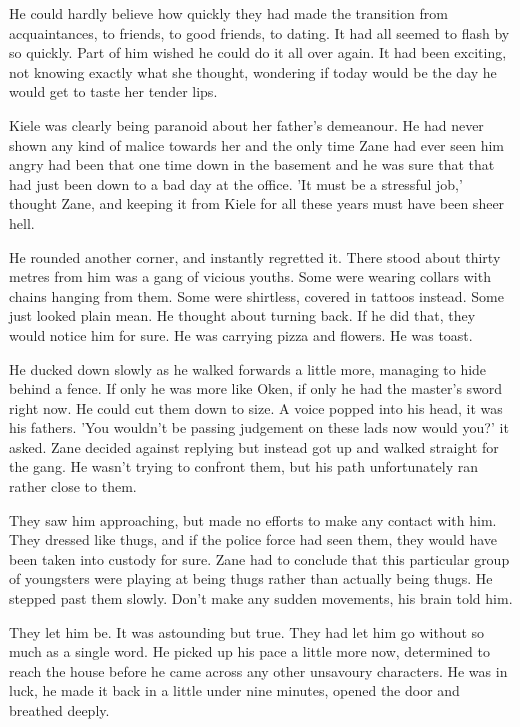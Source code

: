 He could hardly believe how quickly they had made the transition from acquaintances, to friends, to good friends, to dating.  It had all seemed to flash by so quickly.  Part of him wished he could do it all over again.  It had been exciting, not knowing exactly what she thought, wondering if today would be the day he would get to taste her tender lips.  

Kiele was clearly being paranoid about her father's demeanour.  He had never shown any kind of malice towards her and the only time Zane had ever seen him angry had been that one time down in the basement and he was sure that that had just been down to a bad day at the office.  'It must be a stressful job,' thought Zane, and keeping it from Kiele for all these years must have been sheer hell.

He rounded another corner, and instantly regretted it.  There stood about thirty metres from him was a gang of vicious youths.  Some were wearing collars with chains hanging from them.  Some were shirtless, covered in tattoos instead.  Some just looked plain mean.  He thought about turning back.  If he did that, they would notice him for sure.  He was carrying pizza and flowers.  He was toast.

He ducked down slowly as he walked forwards a little more, managing to hide behind a fence.  If only he was more like Oken, if only he had the master's sword right now.  He could cut them down to size.  A voice popped into his head, it was his fathers.  'You wouldn't be passing judgement on these lads now would you?' it asked.  Zane decided against replying but instead got up and walked straight for the gang.  He wasn't trying to confront them, but his path unfortunately ran rather close to them.  

They saw him approaching, but made no efforts to make any contact with him.  They dressed like thugs, and if the police force had seen them, they would have been taken into custody for sure.  Zane had to conclude that this particular group of youngsters were playing at being thugs rather than actually being thugs.  He stepped past them slowly.  Don't make any sudden movements, his brain told him.  

They let him be.  It was astounding but true.  They had let him go without so much as a single word.  He picked up his pace a little more now, determined to reach the house before he came across any other unsavoury characters.  He was in luck, he made it back in a little under nine minutes, opened the door and breathed deeply.  



